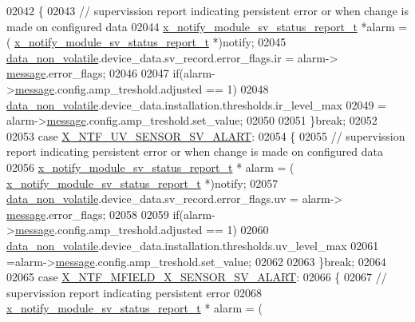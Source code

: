 \begin{DoxyCode}
02042         \{
02043             \textcolor{comment}{// supervission report indicating persistent error or when change is made on configured data}
02044             \hyperlink{a00021_d7/d1b/a00864}{x\_notify\_module\_sv\_status\_report\_t} *alarm = (
      \hyperlink{a00021_d7/d1b/a00864}{x\_notify\_module\_sv\_status\_report\_t} *)notify;
02045             \hyperlink{a00060_a76ac5f917f5308dcd83de0d7c94559fb}{data\_non\_volatile}.device\_data.sv\_record.error\_flags.ir = alarm->
      \hyperlink{a00021_a13393a2d1589483b3bae4d2e79f43980}{message}.error\_flags;
02046 
02047             \textcolor{keywordflow}{if}(alarm->\hyperlink{a00021_a13393a2d1589483b3bae4d2e79f43980}{message}.config.amp\_treshold.adjusted == 1)
02048                 \hyperlink{a00060_a76ac5f917f5308dcd83de0d7c94559fb}{data\_non\_volatile}.device\_data.installation.thresholds.ir\_level\_max
02049                  = alarm->\hyperlink{a00021_a13393a2d1589483b3bae4d2e79f43980}{message}.config.amp\_treshold.set\_value;
02050 
02051         \}\textcolor{keywordflow}{break};
02052 
02053          \textcolor{keywordflow}{case}  \hyperlink{a00021_a146527c519502db561ac17015bf9df5b}{X\_NTF\_UV\_SENSOR\_SV\_ALART}:
02054         \{
02055             \textcolor{comment}{// supervission report indicating persistent error or when change is made on configured data}
02056             \hyperlink{a00021_d7/d1b/a00864}{x\_notify\_module\_sv\_status\_report\_t} * alarm = (
      \hyperlink{a00021_d7/d1b/a00864}{x\_notify\_module\_sv\_status\_report\_t} *)notify;
02057             \hyperlink{a00060_a76ac5f917f5308dcd83de0d7c94559fb}{data\_non\_volatile}.device\_data.sv\_record.error\_flags.uv = alarm->
      \hyperlink{a00021_a13393a2d1589483b3bae4d2e79f43980}{message}.error\_flags;
02058 
02059              \textcolor{keywordflow}{if}(alarm->\hyperlink{a00021_a13393a2d1589483b3bae4d2e79f43980}{message}.config.amp\_treshold.adjusted == 1)
02060                 \hyperlink{a00060_a76ac5f917f5308dcd83de0d7c94559fb}{data\_non\_volatile}.device\_data.installation.thresholds.uv\_level\_max
02061                  =alarm->\hyperlink{a00021_a13393a2d1589483b3bae4d2e79f43980}{message}.config.amp\_treshold.set\_value;
02062 
02063         \}\textcolor{keywordflow}{break};
02064 
02065         \textcolor{keywordflow}{case}  \hyperlink{a00021_a9d9558fb2155bafac3683d00b2a18b3f}{X\_NTF\_MFIELD\_X\_SENSOR\_SV\_ALART}:
02066         \{
02067             \textcolor{comment}{// supervission report indicating persistent error}
02068             \hyperlink{a00021_d7/d1b/a00864}{x\_notify\_module\_sv\_status\_report\_t} * alarm = (

\end{DoxyCode}

